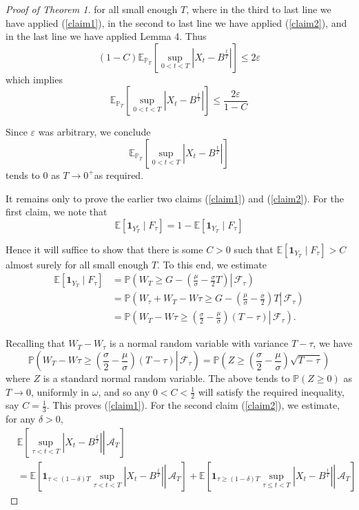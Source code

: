 \documentclass{article}
\theoremstyle{definition}
\theoremstyle{definition}
\begin{document}
\begin{proof}[Proof of Theorem 1]
for all small enough $T$, where in the third to last line we have applied (\ref{claim1}), in the second to last line we have applied (\ref{claim2}), and in the last line we have applied Lemma 4. Thus
$$
(1-C) \mathbb{E}_{\mathbb{P}_{T}}\left[\sup _{0<t<T}\left|X_{t}-B^{\frac{t}{T}}\right|\right] \leq 2 \varepsilon
$$
which implies
$$
\mathbb{E}_{\mathbb{P}_{T}}\left[\sup _{0<t<T}\left|X_{t}-B^{\frac{t}{T}}\right|\right] \leq \frac{2 \varepsilon}{1-C}
$$

Since $\varepsilon$ was arbitrary, we conclude
$$
\mathbb{E}_{\mathbb{P}_{T}}\left[\sup _{0<t<T}\left|X_{t}-B^{\frac{t}{T}}\right|\right]
$$
tends to 0 as $T \rightarrow 0^{+}$as required.

It remains only to prove the earlier two claims (\ref{claim1}) and (\ref{claim2}). For the first claim, we note that
$$
\mathbb{E}\left[\mathbf{1}_{Y_{T}^{c}} \mid F_{\tau}\right]=1-\mathbb{E}\left[\mathbf{1}_{Y_{T}} \mid F_{\tau}\right]
$$

Hence it will suffice to show that there is some $C>0$ such that $\mathbb{E}\left[\mathbf{1}_{Y_{T}} \mid F_{\tau}\right]>C$ almost surely for all small enough $T$. To this end, we estimate
$$
\begin{aligned}
\mathbb{E}\left[\mathbf{1}_{Y_{T}} \mid F_{\tau}\right] & =\mathbb{P}\left(\left.W_{T} \geq G-\left(\frac{\mu}{\sigma}-\frac{\sigma}{2} T\right) \right\rvert\, \mathcal{F}_{\tau}\right) \\
& =\mathbb{P}\left(\left.W_{\tau}+W_{T}-W \tau \geq G-\left(\frac{\mu}{\sigma}-\frac{\sigma}{2}\right) T \right\rvert\, \mathcal{F}_{\tau}\right) \\
& =\mathbb{P}\left(\left.W_{T}-W \tau \geq\left(\frac{\sigma}{2}-\frac{\mu}{\sigma}\right)(T-\tau) \right\rvert\, \mathcal{F}_{\tau}\right) .
\end{aligned}
$$

Recalling that $W_{T}-W_{\tau}$ is a normal random variable with variance $T-\tau$, we have
$$
\mathbb{P}\left(\left.W_{T}-W \tau \geq\left(\frac{\sigma}{2}-\frac{\mu}{\sigma}\right)(T-\tau) \right\rvert\, \mathcal{F}_{\tau}\right)=\mathbb{P}\left(Z \geq\left(\frac{\sigma}{2}-\frac{\mu}{\sigma}\right) \sqrt{T-\tau}\right)
$$
where $Z$ is a standard normal random variable. The above tends to $\mathbb{P}(Z \geq 0)$ as $T \rightarrow 0$, uniformly in $\omega$, and so any $0<C<\frac{1}{2}$ will satisfy the required inequality, say $C=\frac{1}{3}$. This proves (\ref{claim1}). For the second claim (\ref{claim2}), we estimate, for any $\delta>0$,
$$
\begin{aligned}
& \mathbb{E}\left[\left.\sup _{\tau<t<T}\left|X_{t}-B^{\frac{t}{T}}\right| \right\rvert\, \mathcal{A}_{T}\right] \\
& =\mathbb{E}\left[\left.\mathbf{1}_{\tau<(1-\delta) T} \sup _{\tau<t<T}\left|X_{t}-B^{\frac{t}{T}}\right| \right\rvert\, \mathcal{A}_{T}\right]+\mathbb{E}\left[\left.\mathbf{1}_{\tau \geq(1-\delta) T} \sup _{\tau \leq t<T}\left|X_{t}-B^{\frac{t}{T}}\right| \right\rvert\, \mathcal{A}_{T}\right]
\end{aligned}
$$


\end{proof}
\end{document}
